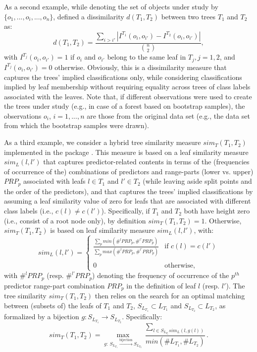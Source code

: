 As a second example, while denoting the set of objects under study by $\{o_1,...,o_i,...,o_n\}$, \citet{Chipman1998} defined a dissimilarity $d(T_1, T_2)$ between two trees $T_1$ and $T_2$ as:
\begin{equation}
d(T_1, T_2)= \frac{\sum_{i>i'}|I^{T_1}(o_i, o_{i'}) - I^{T_2}(o_i, o_{i'}) |}{\binom{n}{2}},
\end{equation}
with $I^{T_j}(o_i, o_{i'}) = 1$ if $o_i$ and $o_{i'}$ belong to the same leaf in $T_j, j=1,2$, and  $I^{T_j}(o_i, o_{i'}) = 0$ otherwise. Obviously, this is a dissimilarity measure that captures the trees' implied classifications only, while considering classifications implied by leaf membership without requiring equality across trees of class labels associated with the leaves. Note that, if different observations were used to create the trees under study (e.g., in case of a forest based on bootstrap samples), the observations $o_i$, $i=1,...,n$ are those from the original data set (e.g., the data set from which the bootstrap samples were drawn).

As a third example, we consider a hybrid tree similarity measure $sim_T(T_1,T_2)$ implemented in the package . This measure is based on a leaf similarity measure $sim_L(l,l')$ that captures predictor-related contents in terms of the (frequencies of occurrence of the) combinations of predictors and range-parts (lower vs. upper) $PRP_p$ associated with leafs $l \in T_1$ and $l' \in T_2$ (while leaving aside split points and the order of the predictors), and that captures the trees' implied classifications by assuming a leaf similarity value of zero for leafs that are associated with different class labels (i.e., $c(l) \neq c(l')$). Specifically, if $T_1$ and $T_2$ both have height zero (i.e., consist of a root node only), by definition $sim_T(T_1,T_2)=1$. Otherwise, $sim_T(T_1,T_2)$ is based on leaf similarity measure $sim_L(l,l')$, with:
\begin{equation}
sim_L(l,l')=\begin{cases}
\frac{\sum_{p} min (\#^{l} PRP_p, \#^{l'} PRP_p)}{\sum_{p} max (\#^{l} PRP_p, \#^{l'}PRP_p)} & \text{if } c(l) = c(l') \\ \\
0 & \text{otherwise},
\end{cases}
\end{equation}
with $\#^{l}PRP_p$ (resp. $\#^{l'}PRP_p$) denoting the frequency of occurrence of the $p^{th}$ predictor range-part combination $PRP_p$ in the definition of leaf $l$ (resp. $l'$). The tree similarity $sim_T(T_1,T_2)$ then relies on the search for an optimal matching between (subsets of) the leafs of $T_1$ and $T_2$, $S_{L_{T_1}} \subset L_{T_1}$ and $S_{L_{T_2}} \subset L_{T_2}$, as formalized by a bijection $g: S_{L_{T_1}} \to S_{L_{T_2}}$. Specifically:
\begin{equation}
sim_T(T_1,T_2)={\underset{g:~S_{L_{T_1}} \overset{\text{bijection}}\longrightarrow S_{L_{T_2}} }\max\frac{\sum_{l \in S_{L_{T_1}}sim_L(l,g(l))}}{min(\#L_{T_1},\#L_{T_2})}}.
\end{equation}


